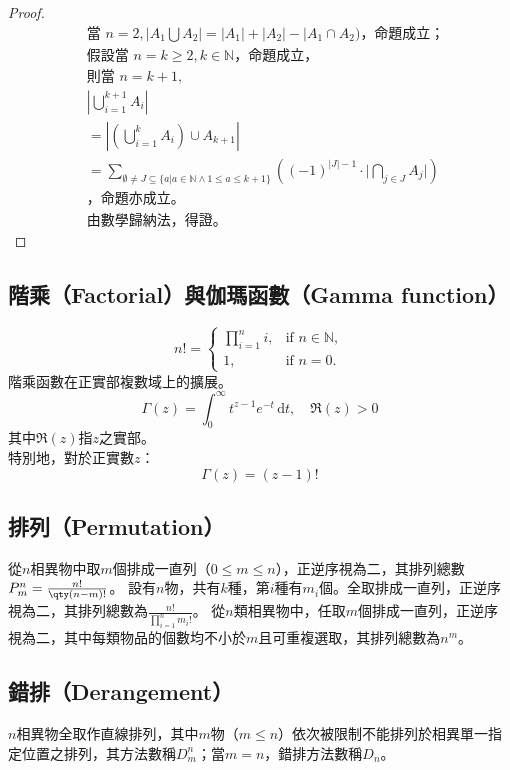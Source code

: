 \documentclass[a4paper,12pt]{report}
\begin{document}
\begin{proof}
\[
\begin{aligned}
& \text{當\ } n=2, |A_1\bigcup A_2| = |A_1|+|A_2| - |A_1\cap A_2)\text{，命題成立；} \\
& \text{假設當\ } n=k\geq 2, k \in \mathbb{N} \text{，命題成立，} \\
& \text{則當\ } n=k+1,\\
& \left| \bigcup_{i=1}^{k+1} A_i \right| \\
& = \left| \left(\bigcup_{i=1}^k A_i\right)\cup A_{k+1} \right| \\
& = \sum _{\emptyset \neq J\subseteq \{a|a \in \mathbb{N} \wedge 1\leq a\leq k+1\}}\left((-1)^{|J|-1}\cdot{\Biggl |}\bigcap _{j\in J}A_j{\Biggr |}\right) \\
& \text{，命題亦成立。} \\
& \text{由數學歸納法，得證。}
\end{aligned}
\]
\end{proof}
\subsection{階乘（Factorial）與伽瑪函數（Gamma function）}
\[n! = \begin{cases}\prod_{i=1}^n i, & \text{if } n \in \mathbb{N}, \\1, & \text{if } n = 0.\end{cases}\]
階乘函數在正實部複數域上的擴展。
\[\Gamma(z) = \int_0^{\infty} t^{z-1} e^{-t} \, \mathrm{d}t, \quad \Re(z) > 0\]
其中$\Re(z)$指$z$之實部。\\
特別地，對於正實數$z$：
\[\Gamma(z) = (z-1)!\]
\subsection{排列（Permutation）}
從$n$相異物中取$m$個排成一直列（$0\leq m\leq n$），正逆序視為二，其排列總數$P_m^n=\frac{n!}{\qty(n-m)!}$。
設有$n$物，共有$k$種，第$i$種有$m_i$個。全取排成一直列，正逆序視為二，其排列總數為$\frac{n!}{\prod_{i=1}^n m_i!}$。
從$n$類相異物中，任取$m$個排成一直列，正逆序視為二，其中每類物品的個數均不小於$m$且可重複選取，其排列總數為$n^m$。
\subsection{錯排（Derangement）}
$n$相異物全取作直線排列，其中$m$物（$m\leq n$）依次被限制不能排列於相異單一指定位置之排列，其方法數稱$D_m^n$；當$m=n$，錯排方法數稱$D_n$。
\end{document}
